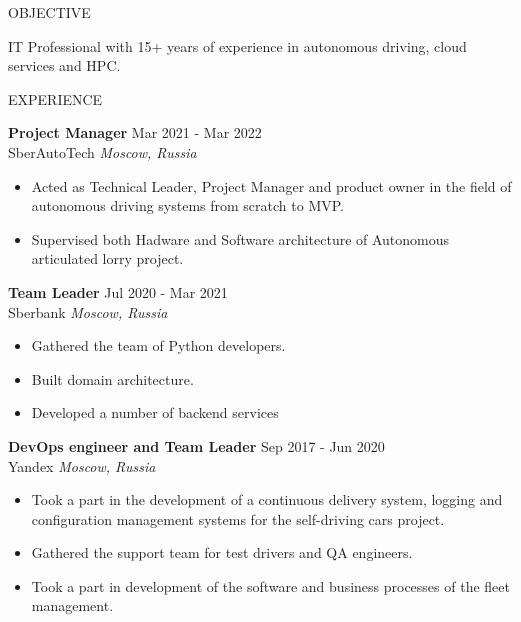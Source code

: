\documentclass{resume} %
\begin{document}

\begin{rSection}{OBJECTIVE}

{IT Professional with 15+ years of experience in autonomous driving, cloud services and HPC.}

\end{rSection}



\begin{rSection}{EXPERIENCE}

\textbf{Project Manager} \hfill Mar 2021 - Mar 2022\\
SberAutoTech \hfill \textit{Moscow, Russia}
\begin{itemize}
   \itemsep -3pt {}
   \item Acted as Technical Leader, Project Manager and product owner in the field of autonomous driving systems from scratch to MVP.
   \item Supervised both Hadware and Software architecture of Autonomous articulated lorry project.

\end{itemize}

\textbf{Team Leader} \hfill Jul 2020 - Mar 2021\\
Sberbank \hfill \textit{Moscow, Russia}
\begin{itemize}
   \itemsep -3pt {}
   \item Gathered the team of Python developers.
   \item Built domain architecture.
   \item Developed a number of backend services
\end{itemize}

\textbf{DevOps engineer and Team Leader} \hfill Sep 2017 - Jun 2020\\
Yandex \hfill \textit{Moscow, Russia}
\begin{itemize}
   \itemsep -3pt {}
   \item Took a part in the development of a continuous delivery system, logging and configuration management systems for the self-driving cars project.
   \item Gathered the support team for test drivers and QA engineers.
   \item Took a part in development of the software and business processes of the fleet management.
\end{itemize}


\end{rSection}
\end{document}
